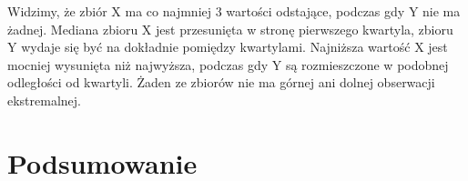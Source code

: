 \documentclass[12pt]{mwart}
\begin{document}
\noindent Widzimy, że zbiór X ma co najmniej 3 wartości odstające, podczas gdy Y nie ma żadnej. Mediana zbioru X jest przesunięta w stronę pierwszego kwartyla, zbioru Y wydaje się być na dokładnie pomiędzy kwartylami. Najniższa wartość X jest mocniej wysunięta niż najwyższa, podczas gdy Y są rozmieszczone w podobnej odległości od kwartyli. Żaden ze zbiorów nie ma górnej ani dolnej obserwacji ekstremalnej.
	\section{Podsumowanie}
\end{document}
